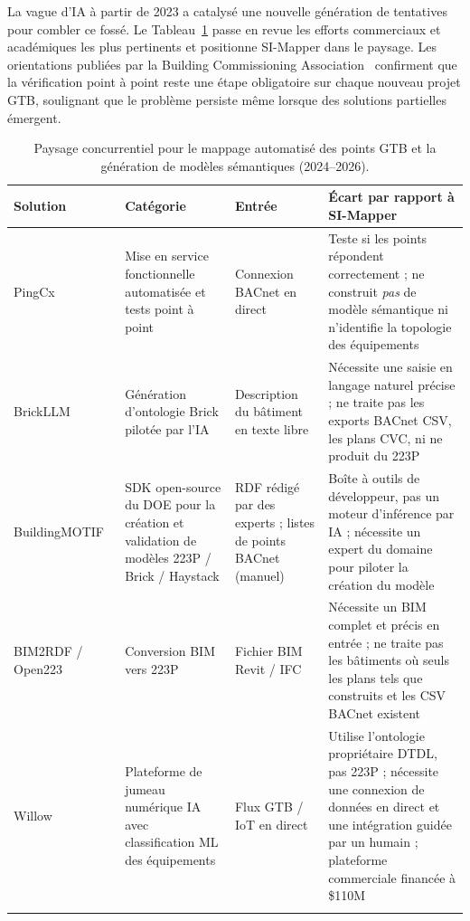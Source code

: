 La vague d'IA à partir de 2023 a catalysé une nouvelle génération de tentatives pour combler ce fossé.
Le Tableau~\ref{tab:landscape} passe en revue les efforts commerciaux et académiques les plus pertinents et positionne
SI-Mapper dans le paysage.
Les orientations publiées par la Building Commissioning Association~\cite{BCA2024} confirment que
la vérification point à point reste une étape obligatoire sur chaque nouveau projet GTB, soulignant que le
problème persiste même lorsque des solutions partielles émergent.

\begin{table}[htbp]
\centering
\caption{Paysage concurrentiel pour le mappage automatisé des points GTB et la génération de modèles sémantiques (2024--2026).}
\label{tab:landscape}
\small
\begin{tabular}{p{3cm}p{3cm}p{3cm}p{4cm}}
\toprule
\textbf{Solution} & \textbf{Catégorie} & \textbf{Entrée} & \textbf{Écart par rapport à SI-Mapper} \\
\midrule

PingCx~\cite{PingCx2024}
  & Mise en service fonctionnelle automatisée et tests point à point
  & Connexion BACnet en direct
  & Teste si les points répondent correctement ; ne construit \emph{pas} de modèle sémantique ni n'identifie la topologie des équipements \\
\addlinespace

BrickLLM~\cite{Perini2025}
  & Génération d'ontologie Brick pilotée par l'IA
  & Description du bâtiment en texte libre
  & Nécessite une saisie en langage naturel précise ; ne traite pas les exports BACnet CSV, les plans CVC, ni ne produit du 223P \\
\addlinespace

BuildingMOTIF~\cite{BuildingMOTIF_NREL}
  & SDK open-source du DOE pour la création et validation de modèles 223P / Brick / Haystack
  & RDF rédigé par des experts ; listes de points BACnet (manuel)
  & Boîte à outils de développeur, pas un moteur d'inférence par IA ; nécessite un expert du domaine pour piloter la création du modèle \\
\addlinespace

BIM2RDF / Open223~\cite{Open223}
  & Conversion BIM vers 223P
  & Fichier BIM Revit / IFC
  & Nécessite un BIM complet et précis en entrée ; ne traite pas les bâtiments où seuls les plans tels que construits et les CSV BACnet existent \\
\addlinespace

Willow~\cite{Willow2025}
  & Plateforme de jumeau numérique IA avec classification ML des équipements
  & Flux GTB / IoT en direct
  & Utilise l'ontologie propriétaire DTDL, pas 223P ; nécessite une connexion de données en direct et une intégration guidée par un humain ; plateforme commerciale financée à \$110M \\
\addlinespace


\end{tabular}
\end{table}

